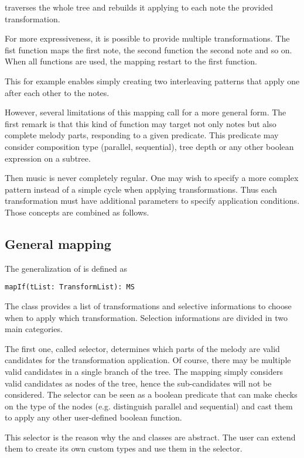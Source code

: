 \documentclass[twocolumn, 11pt]{article}
\begin{document}
 traverses the whole tree and rebuilds it applying to each note the provided transformation.

For more expressiveness, it is possible to provide multiple transformations. The fist function maps the first note, the second function the second note and so on. When all functions are used, the mapping restart to the first function.

This for example enables simply creating two interleaving patterns that apply one after each other to the notes.

However, several limitations of this mapping call for a more general form.
The first remark is that this kind of function may target not only notes but also complete melody parts, responding to a given predicate. This predicate may consider composition type (parallel, sequential), tree depth or any other boolean expression on a subtree.

Then music is never completely regular. One may wish to specify a more complex pattern instead of a simple cycle when applying transformations. Thus each transformation must have additional parameters to specify application conditions. Those concepts are combined as follows.

\subsection{General mapping}

The generalization of  is defined as
\begin{lstlisting}
mapIf(tList: TransformList): MS
\end{lstlisting}
The class  provides a list of transformations and selective informations to choose when to apply which transformation.
Selection informations are divided in two main categories.

The first one, called selector, determines which parts of the melody are valid candidates for the transformation application.
Of course, there may be multiple valid candidates in a single branch of the tree.
The mapping simply considers valid candidates as nodes of the tree, hence the sub-candidates will not be considered.
The selector can be seen as a boolean predicate that can make checks on the type of the nodes (e.g. distinguish parallel and sequential) and cast them to apply any other user-defined boolean function.

This selector is the reason why the  and  classes are abstract. The user can extend them to create its own custom types and use them in the selector.
\end{document}
